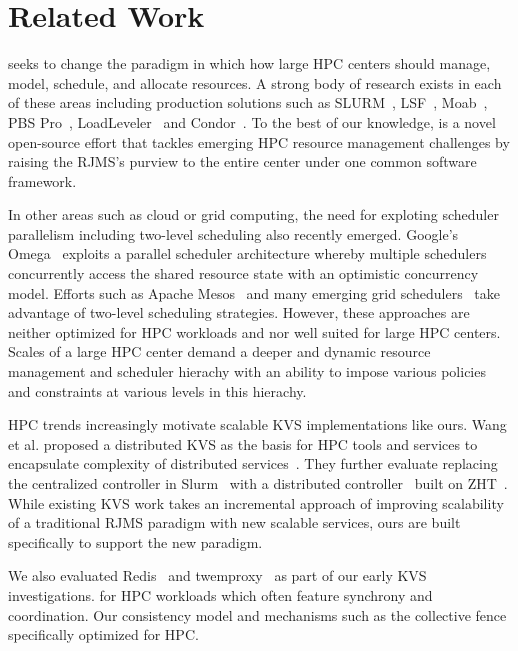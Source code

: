 \section{Related Work}
\flux seeks to change the paradigm in which 
how large HPC centers should manage, model, schedule, and
allocate resources. 
A strong body of research exists in each of these areas 
including production solutions such as SLURM~\cite{Jette02slurm}, 
LSF~\cite{LSF}, Moab~\cite{MOAB}, 
PBS Pro~\cite{PSBPro}, LoadLeveler~\cite{LL}
and Condor~\cite{Litzkow88}.
To the best of our knowledge, \flux is a novel open-source 
effort that tackles emerging HPC resource management challenges 
by raising the RJMS's purview to the entire center 
under one common software framework. 

In other areas such as cloud or grid computing, the need 
for exploting scheduler parallelism including two-level 
scheduling also recently emerged. 
Google's Omega~\cite{Omega} exploits 
a parallel scheduler architecture whereby multiple
schedulers concurrently access the shared resource state
with an optimistic concurrency model. Efforts
such as Apache Mesos~\cite{Mesos} and many emerging
grid schedulers~\cite{MultilevelGrid,Oar} 
take advantage of two-level scheduling strategies.
However, these approaches are neither optimized for HPC workloads 
and nor well suited for large HPC centers. 
Scales of a large HPC center demand a deeper 
and dynamic resource management and scheduler hierachy 
with an ability to impose various policies and
constraints at various levels in this hierachy.

HPC trends increasingly motivate scalable KVS implementations 
like ours. Wang et al. proposed a distributed KVS 
as the basis for HPC tools and services to encapsulate
complexity of distributed services~\cite{Wang:2013:USE:2503210.2503239}.
%
They further evaluate replacing the centralized controller in
Slurm~\cite{Jette02slurm} with a distributed controller~\cite{Slurmpp}
built on ZHT~\cite{Li:2013:ZLR:2510661.2511401}.
While existing KVS work takes an incremental approach of improving 
scalability of a traditional RJMS paradigm with new scalable services,
ours are built specifically to support the new paradigm. 

We also evaluated Redis~\cite{Redis} and twemproxy~\cite{Twemproxy}
as part of our early KVS investigations.
for HPC workloads which often feature synchrony and coordination. 
Our consistency model and mechanisms such as the collective fence 
specifically optimized for HPC.


